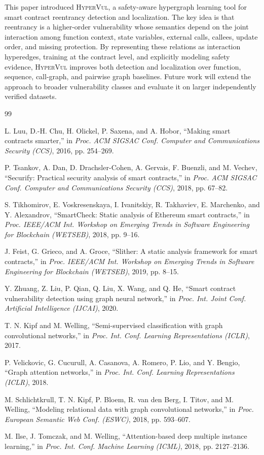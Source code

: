 \documentclass[conference]{IEEEtran}
\newcommand{\tool}{\textsc{HyperVul}}
\begin{document}
This paper introduced \tool{}, a safety-aware hypergraph learning tool for smart contract reentrancy detection and localization. The key idea is that reentrancy is a higher-order vulnerability whose semantics depend on the joint interaction among function context, state variables, external calls, callees, update order, and missing protection. By representing these relations as interaction hyperedges, training at the contract level, and explicitly modeling safety evidence, \tool{} improves both detection and localization over function, sequence, call-graph, and pairwise graph baselines. Future work will extend the approach to broader vulnerability classes and evaluate it on larger independently verified datasets.

\begin{thebibliography}{99}

L. Luu, D.-H. Chu, H. Olickel, P. Saxena, and A. Hobor, ``Making smart contracts smarter,'' in \emph{Proc. ACM SIGSAC Conf. Computer and Communications Security (CCS)}, 2016, pp. 254--269.

P. Tsankov, A. Dan, D. Drachsler-Cohen, A. Gervais, F. Buenzli, and M. Vechev, ``Securify: Practical security analysis of smart contracts,'' in \emph{Proc. ACM SIGSAC Conf. Computer and Communications Security (CCS)}, 2018, pp. 67--82.

S. Tikhomirov, E. Voskresenskaya, I. Ivanitskiy, R. Takhaviev, E. Marchenko, and Y. Alexandrov, ``SmartCheck: Static analysis of Ethereum smart contracts,'' in \emph{Proc. IEEE/ACM Int. Workshop on Emerging Trends in Software Engineering for Blockchain (WETSEB)}, 2018, pp. 9--16.

J. Feist, G. Grieco, and A. Groce, ``Slither: A static analysis framework for smart contracts,'' in \emph{Proc. IEEE/ACM Int. Workshop on Emerging Trends in Software Engineering for Blockchain (WETSEB)}, 2019, pp. 8--15.

Y. Zhuang, Z. Liu, P. Qian, Q. Liu, X. Wang, and Q. He, ``Smart contract vulnerability detection using graph neural network,'' in \emph{Proc. Int. Joint Conf. Artificial Intelligence (IJCAI)}, 2020.

T. N. Kipf and M. Welling, ``Semi-supervised classification with graph convolutional networks,'' in \emph{Proc. Int. Conf. Learning Representations (ICLR)}, 2017.

P. Velickovic, G. Cucurull, A. Casanova, A. Romero, P. Lio, and Y. Bengio, ``Graph attention networks,'' in \emph{Proc. Int. Conf. Learning Representations (ICLR)}, 2018.

M. Schlichtkrull, T. N. Kipf, P. Bloem, R. van den Berg, I. Titov, and M. Welling, ``Modeling relational data with graph convolutional networks,'' in \emph{Proc. European Semantic Web Conf. (ESWC)}, 2018, pp. 593--607.

M. Ilse, J. Tomczak, and M. Welling, ``Attention-based deep multiple instance learning,'' in \emph{Proc. Int. Conf. Machine Learning (ICML)}, 2018, pp. 2127--2136.

\end{thebibliography}
\end{document}
